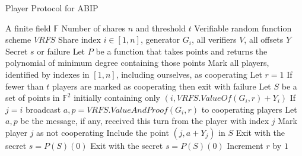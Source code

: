 \documentclass{dalcsthesis}
\begin{document}
\begin{algorithm}
  \caption{Player Protocol for ABIP}
  \label{alg:ABIP:Player}
  \begin{algorithmic}
    \INPUT A finite field $\mathbb{F}$
    \INPUT Number of shares $n$ and threshold $t$
    \INPUT Verifiable random function scheme $VRFS$
    \INPUT Share index $i \in [1, n]$, generator $G_i$, all verifiers $V$, all offsets $Y$
    \OUTPUT Secret $s$ or failure
    \STATE Let $P$ be a function that takes points and returns the polynomial of minimum degree containing those points 
    \STATE Mark all players, identified by indexes in $[1, n]$, including ourselves, as cooperating
    \STATE Let $r = 1$
      \STATE If fewer than $t$ players are marked as cooperating then exit with failure
      \STATE Let $S$ be a set of points in $\mathbb{F}^2$ initially containing only $(i, VRFS.ValueOf(G_i, r) + Y_i)$
        \STATE If $j = i$ broadcast $a,p = VRFS.ValueAndProof(G_i, r)$ to cooperating players
        \STATE Let $a, p$ be the message, if any, received this turn from the player with index $j$
          \STATE Mark player $j$ as not cooperating
        \ELSE
          \STATE Include the point $(j, a + Y_j)$ in $S$
            \STATE Exit with the secret $s = P(S)(0)$
          \ENDIF
        \ENDIF
      \ENDFOR
        \STATE Exit with the secret $s = P(S)(0)$
      \ENDIF
      \STATE Increment $r$ by $1$
    \ENDWHILE
  \end{algorithmic}
\end{algorithm}
\end{document}
